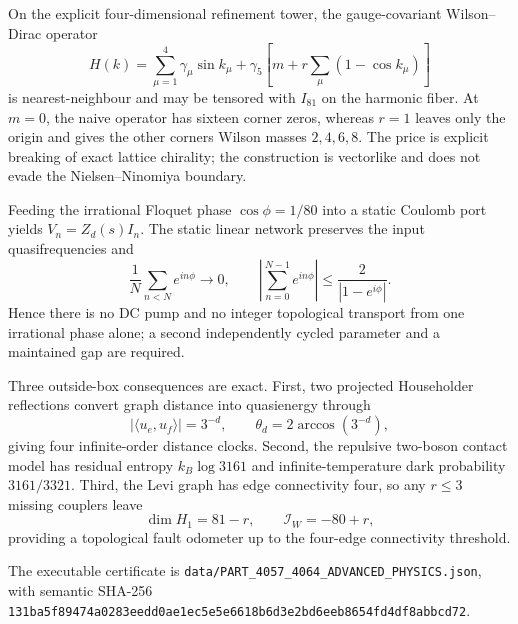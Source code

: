 On the explicit four-dimensional refinement tower, the gauge-covariant Wilson--Dirac operator
\[
 H(k)=\sum_{\mu=1}^{4}\gamma_\mu\sin k_\mu+\gamma_5\left[m+r\sum_\mu(1-\cos k_\mu)\right]
\]
is nearest-neighbour and may be tensored with $I_{81}$ on the harmonic fiber.  At $m=0$, the naive operator has sixteen corner zeros, whereas $r=1$ leaves only the origin and gives the other corners Wilson masses $2,4,6,8$.  The price is explicit breaking of exact lattice chirality; the construction is vectorlike and does not evade the Nielsen--Ninomiya boundary.

Feeding the irrational Floquet phase $\cos\phi=1/80$ into a static Coulomb port yields $V_n=Z_d(s)I_n$.  The static linear network preserves the input quasifrequencies and
\[
 \frac1N\sum_{n<N}e^{in\phi}\longrightarrow0,
 \qquad
 \left|\sum_{n=0}^{N-1}e^{in\phi}\right|\le \frac{2}{|1-e^{i\phi}|}.
\]
Hence there is no DC pump and no integer topological transport from one irrational phase alone; a second independently cycled parameter and a maintained gap are required.

Three outside-box consequences are exact.  First, two projected Householder reflections convert graph distance into quasienergy through
\[
 |\langle u_e,u_f\rangle|=3^{-d},\qquad \theta_d=2\arccos(3^{-d}),
\]
giving four infinite-order distance clocks.  Second, the repulsive two-boson contact model has residual entropy $k_B\log3161$ and infinite-temperature dark probability $3161/3321$.  Third, the Levi graph has edge connectivity four, so any $r\le3$ missing couplers leave
\[
 \dim H_1=81-r,\qquad \mathcal I_W=-80+r,
\]
providing a topological fault odometer up to the four-edge connectivity threshold.

The executable certificate is \texttt{data/PART\_4057\_4064\_ADVANCED\_PHYSICS.json}, with semantic SHA-256 \texttt{131ba5f89474a0283eedd0ae1ec5e5e6618b6d3e2bd6eeb8654fd4df8abbcd72}.
